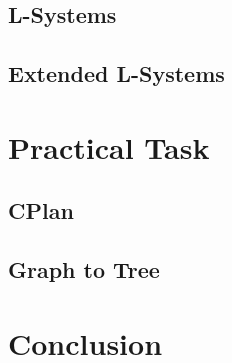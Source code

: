 \documentclass[11pt, a4paper]{report}
\begin{document}
\section{L-Systems}

\section{Extended L-Systems} 


\chapter{Practical Task} 

\section{CPlan}

\section{Graph to Tree}


\chapter{Conclusion}

\appendix
\glsaddall
\printglossaries
\end{document}
